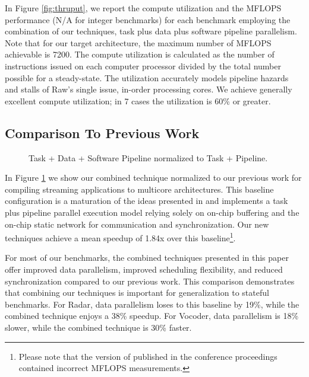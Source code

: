 In Figure \ref{fig:thruput}, we report the compute utilization and the
MFLOPS performance (N/A for integer benchmarks) for each benchmark
employing the combination of our techniques, task plus data plus
software pipeline parallelism. Note that for our target architecture,
the maximum number of MFLOPS achievable is 7200.  The compute
utilization is calculated as the number of instructions issued on each
computer processor divided by the total number possible for a
steady-state.  The utilization accurately models pipeline hazards and
stalls of Raw's single issue, in-order processing cores.  We achieve
generally excellent compute utilization; in 7 cases the utilization is
60\% or greater.


\subsection{Comparison To Previous Work}

\begin{figure}[t]
\centering
{}
\caption{Task + Data + Software Pipeline normalized to Task + Pipeline.
\protect\label{fig:vs-space}}
\vspace{-6pt}
\end{figure}

\begin{figure*}[t]
\centering
{}
\caption{Throughput Speedup Comparison and  Task + Data + Software Pipeline performance results.
\protect\label{fig:thruput}}
\vspace{-6pt}
\end{figure*}
In Figure \ref{fig:vs-space} we show our combined technique normalized
to our previous work for compiling streaming applications to multicore
architectures.  This baseline configuration is a maturation of the
ideas presented in \cite{streamit-asplos} and implements a task plus
pipeline parallel execution model relying solely on on-chip buffering
and the on-chip static network for communication and
synchronization. Our new techniques achieve a mean speedup of 1.84x
over this baseline\footnote{Please note that the version of
\cite{streamit-asplos} published in the conference proceedings
contained incorrect MFLOPS measurements.}.

For most of our benchmarks, the combined techniques presented in this
paper offer improved data parallelism, improved scheduling
flexibility, and reduced synchronization compared to our previous
work. This comparison demonstrates that combining our techniques is
important for generalization to stateful benchmarks.  For Radar, data
parallelism loses to this baseline by 19\%, while the combined
technique enjoys a 38\% speedup. For Vocoder, data parallelism is 18\%
slower, while the combined technique is 30\% faster.

